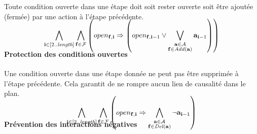 Toute condition ouverte dans une \'{e}tape doit soit rester ouverte soit \^{e}tre ajout\'{e}e (ferm\'{e}e) par une action \`{a} l'\'{e}tape pr\'{e}c\'{e}dente.

\begin{small}
\begin{multline*}
~\\[-3em]
\bigwedge\limits_{\substack{\mathbf{i}\in [2..\mathbf{\length}]}}\bigwedge\limits_{\substack{\mathbf{f}\in \mathbf{\F}}}\left(open_{\mathbf{\f},\mathbf{i}} \Rightarrow \left(open_{\mathbf{\f},\mathbf{i} - 1} \vee \bigvee\limits_{\substack{\mathbf{\a}\in \mathbf{\A}\\\mathbf{\f} \in \add{\mathbf{\a}}}}\mathbf{\a}_{\mathbf{i} - 1}\right)\right)\hfill\\[-2em]
\end{multline*}
\end{small}



\paragraph*{Protection des conditions ouvertes}

Une condition ouverte dans une \'{e}tape donn\'{e}e ne peut pas \^{e}tre supprim\'{e}e \`{a} l'\'{e}tape pr\'{e}c\'{e}dente. Cela garantit de ne rompre aucun lien de causalit\'{e} dans le plan.
\begin{small}
\begin{multline*}
~\\[-3em]
\bigwedge\limits_{\substack{\mathbf{i}\in [2..\mathbf{\length}]}}\bigwedge\limits_{\substack{\mathbf{\f}\in \mathbf{\F}}}\left(open_{\mathbf{\f},\mathbf{i}} \Rightarrow \bigwedge\limits_{\substack{\mathbf{\a}\in \mathbf{\A}\\\mathbf{\f} \in \del{\mathbf{\a}}}}\neg \mathbf{\a}_{\mathbf{i} - 1}\right)\hfill\\[-3em]
\end{multline*}
\end{small}

\paragraph*{Pr\'{e}vention des interactions n\'{e}gatives}

